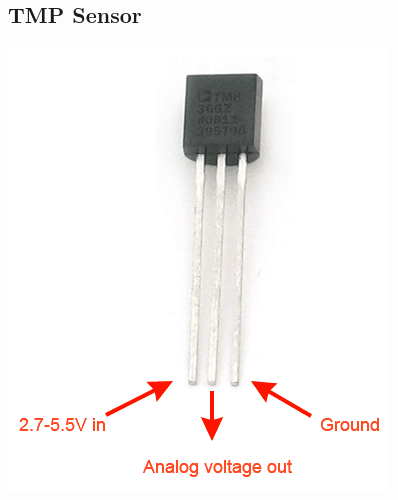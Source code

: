 \documentclass[a4paper,12pt,twoside,openright,titlepage]{book}
\begin{document}
\subsection{TMP Sensor}
\begin{center}
\includegraphics[scale=0.8]{TMP-36}
\end{center}
\end{document}
